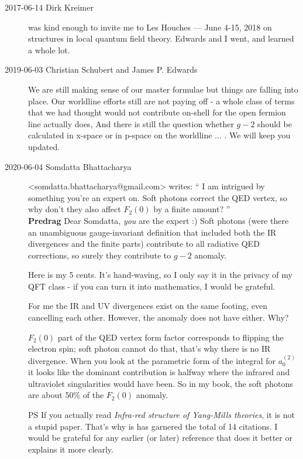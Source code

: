 \begin{description}
%

\item[2017-06-14 Dirk Kreimer] was kind enough to invite me to
{Les Houches — June 4-15, 2018} on structures in local quantum field
theory. Edwards and I went, and learned a whole lot.

\item[2019-06-03 Christian Schubert and James P. Edwards]
We are still making sense of our master formulae but things are falling
into place. Our worldline efforts still are not paying off - a whole
class of terms that we had thought would not contribute on-shell for the
open fermion line actually does, And there is still the question whether
$g-2$ should be calculated in x-space or in p-space on the worldline
$\dots$ . We will keep you updated.

\item[2020-06-04 Somdatta Bhattacharya] <somdatta.bhattacharya@gmail.com>
writes: ``
I am intrigued by something you're an expert on. Soft photons correct the
QED vertex, so why don't they also affect $F_2(0)$ by a finite amount?
''
\\
{\bf Predrag} Dear Somdatta, \emph{you} are the expert
:) Soft photons (were there an unambiguous gauge-invariant definition
that included both the IR divergences and the finite parts) contribute to
all radiative QED corrections, so surely they contribute to $g-2$
anomaly.

Here is my 5 cents. It's hand-waving, so I only say it in the privacy
of my QFT class - if you can turn it into mathematics, I would be grateful.

For me the IR and UV divergences exist on the same footing, even
cancelling each other. However, the anomaly
 does not have either. Why?

$F_2(0)$ part of the QED vertex form factor corresponds to flipping
the electron spin; soft photon cannot do that, that's why there is no
IR divergence. When you look at the parametric form of the
integral for $a_{0}^{(2)}$ it looks like the dominant contribution
is halfway where the infrared and ultraviolet singularities
would have been. So in my book, the soft photons are about 50\%
of the $F_2(0)$ anomaly.

PS If you actually read {\em Infra-red structure of {Yang-Mills}
theories}, it is not a stupid paper. That's why is has
garnered the total of 14 citations. I would be grateful for any earlier
(or later) reference that does it better or explains it more clearly.


\end{description}
